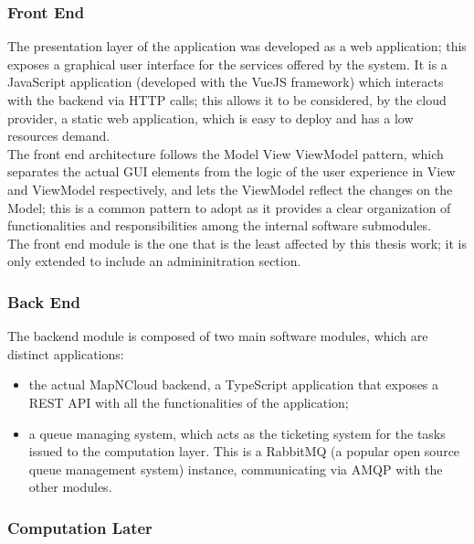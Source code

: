   \subsubsection{Front End}
  \label{ssse:originalfrontend}
    The presentation layer of the application was developed as a web application; this exposes a graphical user interface for the services offered by the system. It is a JavaScript application (developed with the VueJS framework) which interacts with the backend via HTTP calls; this allows it to be considered, by the cloud provider, a static web application, which is easy to deploy and has a low resources demand.\\
    The front end architecture follows the Model View ViewModel pattern, which separates the actual GUI elements from the logic of the user experience in View and ViewModel respectively, and lets the ViewModel reflect the changes on the Model; this is a common pattern to adopt as it provides a clear organization of functionalities and responsibilities among the internal software submodules.\\
    The front end module is the one that is the least affected by this thesis work; it is only extended to include an admininitration section.

  \subsubsection{Back End}
  \label{ssse:originalbackend}
    The backend module is composed of two main software modules, which are distinct applications:
    \begin{itemize}
      \item the actual MapNCloud backend, a TypeScript application that exposes a REST API with all the functionalities of the application;
      \item a queue managing system, which acts as the ticketing system for the tasks issued to the computation layer. This is a RabbitMQ (a popular open source queue management system) instance, communicating via AMQP\cite{AMQP} with the other modules.
    \end{itemize}


  \subsubsection{Computation Later}
  \label{ssse:originalcomputationlayer}
